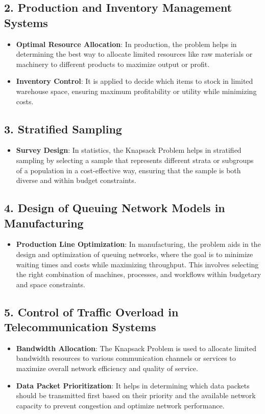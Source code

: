 \documentclass[runningheads]{llncs}
\begin{document}
\subsection*{2. Production and Inventory Management Systems}
\begin{itemize}
    \item \textbf{Optimal Resource Allocation}: In production, the problem helps in determining the best way to allocate limited resources like raw materials or machinery to different products to maximize output or profit.
    \item \textbf{Inventory Control}: It is applied to decide which items to stock in limited warehouse space, ensuring maximum profitability or utility while minimizing costs.
\end{itemize}

\subsection*{3. Stratified Sampling}
\begin{itemize}
    \item \textbf{Survey Design}: In statistics, the Knapsack Problem helps in stratified sampling by selecting a sample that represents different strata or subgroups of a population in a cost-effective way, ensuring that the sample is both diverse and within budget constraints.
\end{itemize}

\subsection*{4. Design of Queuing Network Models in Manufacturing}
\begin{itemize}
    \item \textbf{Production Line Optimization}: In manufacturing, the problem aids in the design and optimization of queuing networks, where the goal is to minimize waiting times and costs while maximizing throughput. This involves selecting the right combination of machines, processes, and workflows within budgetary and space constraints.
\end{itemize}

\subsection*{5. Control of Traffic Overload in Telecommunication Systems}
\begin{itemize}
    \item \textbf{Bandwidth Allocation}: The Knapsack Problem is used to allocate limited bandwidth resources to various communication channels or services to maximize overall network efficiency and quality of service.
    \item \textbf{Data Packet Prioritization}: It helps in determining which data packets should be transmitted first based on their priority and the available network capacity to prevent congestion and optimize network performance.
\end{itemize}
\end{document}
